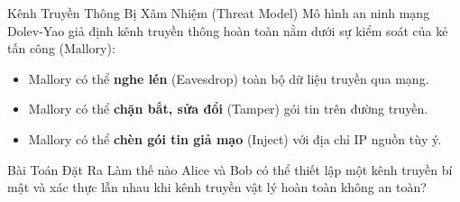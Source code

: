 \begin{frame}{Kênh Truyền Thông Bị Xâm Nhiệm (Threat Model)}
  Mô hình an ninh mạng Dolev-Yao giả định kênh truyền thông hoàn toàn nằm dưới sự kiểm soát của kẻ tấn công (Mallory):
  \begin{itemize}
    \item Mallory có thể \textbf{nghe lén} (Eavesdrop) toàn bộ dữ liệu truyền qua mạng.
    \item Mallory có thể \textbf{chặn bắt, sửa đổi} (Tamper) gói tin trên đường truyền.
    \item Mallory có thể \textbf{chèn gói tin giả mạo} (Inject) với địa chỉ IP nguồn tùy ý.
  \end{itemize}

  \begin{alertblock}{Bài Toán Đặt Ra}
    Làm thế nào Alice và Bob có thể thiết lập một kênh truyền bí mật và xác thực lẫn nhau khi kênh truyền vật lý hoàn toàn không an toàn?
  \end{alertblock}
\end{frame}

